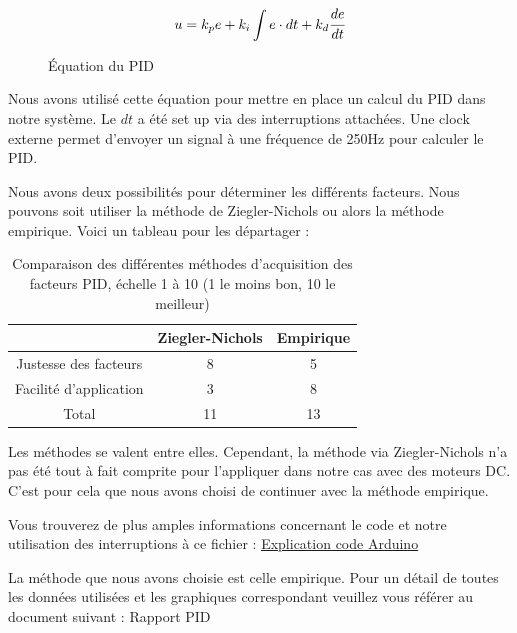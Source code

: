 \documentclass[
	a4paper,									%
	11pt,										%
	twoside,									%
	openright,									%
	notitlepage,									%
	parskip=half,								%
]{scrreprt}										%
\begin{document}
\begin{figure}[h]
	\[u=k_pe + k_i \int e \cdot dt + k_d \cfrac{de}{dt}\] 
	\caption{Équation du PID}
	\label{eq1}
\end{figure}

Nous avons utilisé cette équation pour mettre en place un calcul du PID dans notre système. Le $dt$ a été 
set up via des interruptions attachées. Une clock externe permet d'envoyer un signal à une fréquence de 250Hz
pour calculer le PID. \par

Nous avons deux possibilités pour déterminer les différents facteurs. Nous pouvons soit utiliser la méthode 
de Ziegler-Nichols ou alors la méthode empirique. Voici un tableau pour les départager : 

\begin{table}[!ht]
    \begin{center}
        \vspace{5mm}
        \label{tab:table5}
        \begin{tabular}{c|c|c} %
            \toprule
            \textbf{ } & \textbf{Ziegler-Nichols} & \textbf{Empirique}\\
            \midrule
            Justesse des facteurs & 8 & 5\\
            Facilité d'application & 3 & 8\\
            \midrule
			Total & 11 & 13\\
            \bottomrule
        \end{tabular}
    \end{center}    
	\caption{Comparaison des différentes méthodes d'acquisition des facteurs PID, échelle 1 à 10 (1 le moins bon, 10 le meilleur)}
\end{table}

Les méthodes se valent entre elles. Cependant, la méthode via Ziegler-Nichols n'a pas été tout à fait comprite pour l'appliquer 
dans notre cas avec des moteurs DC. C'est pour cela que nous avons choisi de continuer avec la méthode empirique. \par


Vous trouverez de plus amples informations concernant le code et notre utilisation des interruptions
à ce fichier : \href{run:./Code_Arduino.pdf}{Explication code Arduino}

La méthode que nous avons choisie est celle empirique. Pour un détail de toutes les données utilisées 
et les graphiques correspondant veuillez vous référer au document suivant : Rapport PID \par
\end{document}
